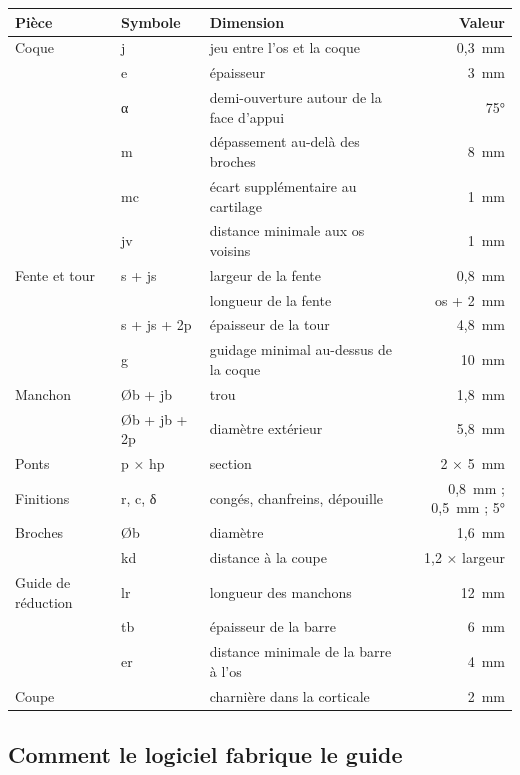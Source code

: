 \documentclass[11pt,a4paper]{article}
\begin{document}
\begin{longtable}{@{}llp{5.9cm}r@{}}
\toprule
\textbf{Pièce} & \textbf{Symbole} & \textbf{Dimension} & \textbf{Valeur} \\ \midrule \endhead
Coque & j & jeu entre l'os et la coque & 0,3~mm \\
 & e & épaisseur & 3~mm \\
 & α & demi-ouverture autour de la face d'appui & 75° \\
 & m & dépassement au-delà des broches & 8~mm \\
 & mc & écart supplémentaire au cartilage & 1~mm \\
 & jv & distance minimale aux os voisins & 1~mm \\
Fente et tour & s + js & largeur de la fente & 0,8~mm \\
 & & longueur de la fente & os + 2~mm \\
 & s + js + 2p & épaisseur de la tour & 4,8~mm \\
 & g & guidage minimal au-dessus de la coque & 10~mm \\
Manchon & Øb + jb & trou & 1,8~mm \\
 & Øb + jb + 2p & diamètre extérieur & 5,8~mm \\
Ponts & p × hp & section & 2 × 5~mm \\
Finitions & r, c, δ & congés, chanfreins, dépouille & 0,8~mm ; 0,5~mm ; 5° \\
Broches & Øb & diamètre & 1,6~mm \\
 & kd & distance à la coupe & 1,2 × largeur \\
Guide de réduction & lr & longueur des manchons & 12~mm \\
 & tb & épaisseur de la barre & 6~mm \\
 & er & distance minimale de la barre à l'os & 4~mm \\
Coupe & & charnière dans la corticale & 2~mm \\
\bottomrule
\end{longtable}

\subsection{Comment le logiciel fabrique le guide}
\end{document}
